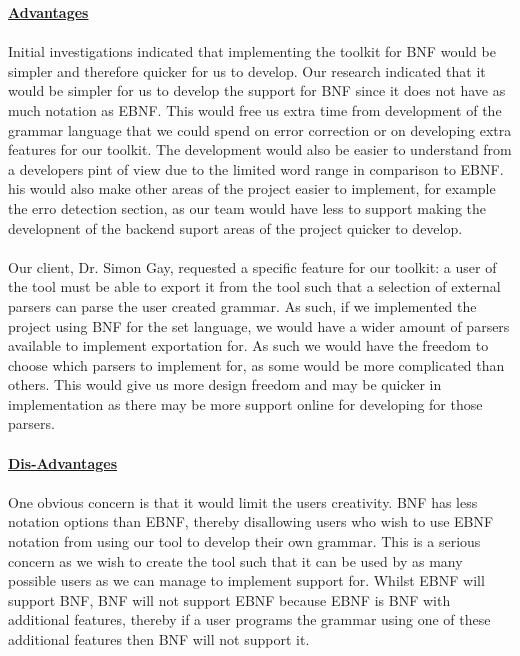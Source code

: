 \documentclass{l3proj}
\begin{document}
\textbf {\underline{Advantages}}\\
\\
 Initial investigations indicated that implementing the toolkit for BNF would be simpler and therefore quicker for us to develop. Our research indicated that it would be simpler for us to develop the support for BNF since it does not have as much notation as EBNF. This would free us extra time from development of the grammar language that we could spend on error correction or on developing extra features for our toolkit. The development would also be easier to understand from a developers pint of view due to the limited word range in comparison to EBNF. his would also make other areas of the project easier to implement, for example the erro detection section, as our team would have less to support making the developnent of the backend suport areas of the project quicker to develop. \\
\\
Our client, Dr. Simon Gay, requested a specific feature for our toolkit: a user of the tool must be able to export it from the tool such that a selection of external parsers can parse the user created grammar. As such, if we implemented the project using BNF for the set language, we would have a wider amount of parsers available to implement exportation for. As such we would have the freedom to choose which parsers to implement for, as some would be more complicated than others. This would give us more design freedom and may be quicker in implementation as there may be more support online for developing for those parsers.\\
\\
\textbf {\underline{Dis-Advantages}}\\
\\
One obvious concern is that it would limit the users creativity. BNF has less notation options than EBNF, thereby disallowing users who wish to use EBNF notation from using our tool to develop their own grammar. This is a serious concern as we wish to create the tool such that it can be used by as many possible users as we can manage to implement support for. Whilst EBNF will support BNF, BNF will not support EBNF because EBNF is BNF with additional features, thereby if a user programs the grammar using one of these additional features then BNF will not support it.\\
\\
\end{document}
